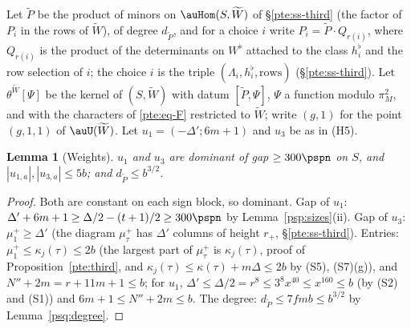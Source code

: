 \documentclass[10pt]{amsart}
\newtheorem{lemma}[theorem]{Lemma}
\theoremstyle{definition}
\theoremstyle{remark}
\begin{document}
Let $\widetilde P$ be the product of minors on $\auHom(S,\widetilde W)$ of \S\ref{pte:ss-third} (the
factor of $P_i$ in the rows of $\widetilde W$), of degree $d_{\widetilde P}$, and for a choice $i$ write
$P_i=\widetilde P\cdot Q_{r(i)}$, where $Q_{r(i)}$ is the product of the determinants on $W^\flat$
attached to the class $h^\flat_i$ and the row selection of $i$; the choice $i$ is the triple
$(\Lambda_i,h^\flat_i,\text{rows})$ (\S\ref{pte:ss-third}). Let $\theta^{\widetilde W}[\Psi]$ be the kernel
of $(S,\widetilde W)$ with datum $[\widetilde P,\Psi]$, $\Psi$ a function modulo $\pi_M^2$, and with the
characters of \eqref{pte:eq-F} restricted to $\widetilde W$; write $(g,1)$ for the point $(g,1,1)$ of
$\auU(\widetilde W)$. Let $u_1=(-\Delta';6m+1)$ and $u_3$ be as in (H5).

\begin{lemma}[Weights]\label{psp:weights}
$u_1$ and $u_3$ are dominant of gap $\ge300\pspn$ on $S$, and $|u_{1,a}|,|u_{3,a}|\le5b$; and
$d_{\widetilde P}\le b^{3/2}$.
\end{lemma}
\begin{proof}
Both are constant on each sign block, so dominant. Gap of $u_1$: $\Delta'+6m+1\ge\Delta/2-(t+1)/2\ge
300\pspn$ by Lemma~\ref{psp:sizes}(ii). Gap of $u_3$: $\mu^+_1\ge\Delta'$ (the diagram $\mu^+_\tau$ has
$\Delta'$ columns of height $r_+$, \S\ref{pte:ss-third}). Entries: $\mu^+_1\le\kappa_j(\tau)\le2b$
(the largest part of $\mu^+_\tau$ is $\kappa_j(\tau)$, proof of Proposition~\ref{pte:third}, and
$\kappa_j(\tau)\le\kappa(\tau)+m\Delta\le2b$ by (S5), (S7)(g)), and $N''+2m=r+11m+1\le b$; for $u_1$, $\Delta'\le\Delta/2=r^8\le3^8x^{40}\le x^{160}\le b$ (by (S2) and (S1)) and
$6m+1\le N''+2m\le b$. The degree: $d_{\widetilde P}\le7fmb\le b^{3/2}$ by Lemma~\ref{psq:degree}.
\end{proof}
\end{document}
